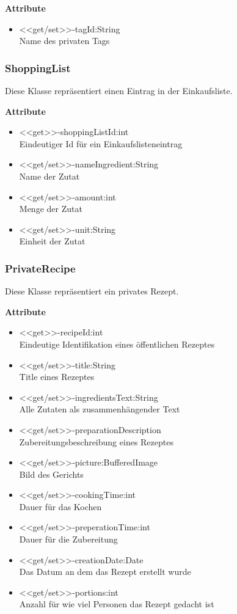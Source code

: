 \textbf{Attribute}
\begin{itemize}
	\item <<get/set>>-tagId:String \\Name des privaten Tags
\end{itemize}

\subsubsection{ShoppingList}
Diese Klasse repräsentiert einen Eintrag in der Einkaufsliste.

\textbf{Attribute}
\begin{itemize}
	\item <<get>>-shoppingListId:int \\Eindeutiger Id für ein Einkaufslisteneintrag
	\item <<get/set>>-nameIngredient:String \\Name der Zutat
	\item <<get/set>>-amount:int \\Menge der Zutat
	\item <<get/set>>-unit:String \\Einheit der Zutat
\end{itemize}

\subsubsection{PrivateRecipe}
Diese Klasse repräsentiert ein privates Rezept.

\textbf{Attribute}
\begin{itemize}
	\item <<get>>-recipeId:int\\Eindeutige Identifikation eines öffentlichen Rezeptes
	\item <<get/set>>-title:String\\Title eines Rezeptes
	\item <<get/set>>-ingredientsText:String\\Alle Zutaten als zusammenhängender Text
	\item <<get/set>>-preparationDescription\\Zubereitungsbeschreibung eines Rezeptes
	\item <<get/set>>-picture:BufferedImage\\Bild des Gerichts
	\item <<get/set>>-cookingTime:int\\Dauer für das Kochen
	\item <<get/set>>-preperationTime:int\\Dauer für die Zubereitung
	\item <<get/set>>-creationDate:Date\\Das Datum an dem das Rezept erstellt wurde
	\item <<get/set>>-portions:int\\Anzahl für wie viel Personen das Rezept gedacht ist
\end{itemize}

